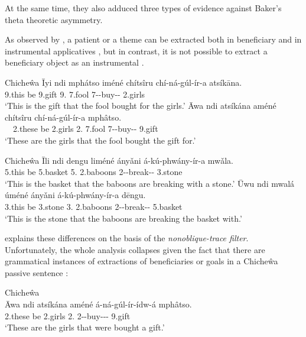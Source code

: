 \documentclass[output=paper,hidelinks]{langscibook}
\begin{document}
\largerpage[-1]
At the same time, they also adduced three types of evidence against Baker’s theta theoretic asymmetry.


As observed by \citet{Baker:Theta}, a patient or a theme can be extracted both in beneficiary  and in instrumental applicatives , but in contrast, it is not possible to extract a beneficiary object  as an instrumental .

\ea\label{ex:African:14} Chiche\^wa
\ea\label{ex:African:14a}
    \gll Īyi ndi mphátso iméné chítsîru chí-ná-gúl-ír-a atsík\=ana.\\
        9.this be   9.gift      9.{\REL} 7.fool    7{\SBJ}-{\PST}-buy-{}-
          2.girls\\
    \glt ‘This is the gift that the fool bought for the girls.’
\ex\label{ex:African:14b}
    \gll *Āwa  ndi atsíkána améné chítsîru chí-ná-gúl-ír-a mph\^atso.\\
       ~~2.these be  2.girls    2.{\REL} 7.fool   7{\SBJ}-{\PST}-buy-{}- 9.gift \\
    \glt ‘These are the girls that the fool bought the gift for.’
\z
\z

\newpage
\ea\label{ex:African:15} Chiche\^wa
\ea\label{ex:African:15a}
    \gll Īli ndi dengu liméné ány\v{a}ni       á-kú-phwány-ír-a mw\v{a}la.\\
        5.this be  5.basket 5.{\REL} 2.baboons 2{\SBJ}-{\PROG}-break-{}-        3.stone\\
    \glt ‘This is the basket that the baboons are breaking with a stone.’
\ex\label{ex:African:15b}
    \gll \={U}wu   ndi  mwalá úméné ány\v{a}ni
      á-kú-phwány-ír-a dēngu.\\
       3.this  be  3.stone 3.{\REL} 2.baboons 2{\SBJ}-{\PROG}-break-{}- 5.basket \\
    \glt ‘This is the stone that the baboons are breaking the basket with.’
    \z
    \z

\citet{Baker:Theta} explains these differences on the basis of the \textit{nonoblique-trace filter}. Unfortunately, the whole analysis collapses given the fact that there are grammatical instances of extractions of beneficiaries or goals in a Chiche\^wa passive sentence \citep[498]{AlsinaMchombo1990}:

\ea\label{ex:African:16} Chiche\^wa\\
    \gll \={A}wa      ndi  atsíkána  améné  á-ná-gúl-ír-ídw-á mph\^{a}tso.\\
        2.these  be   2.girls     2.{\REL}  2{\SBJ}-{\PST}-buy-{}-{\PASS}- 9.gift\\
    \glt ‘These are the girls that were bought a gift.’
    \z
\end{document}
